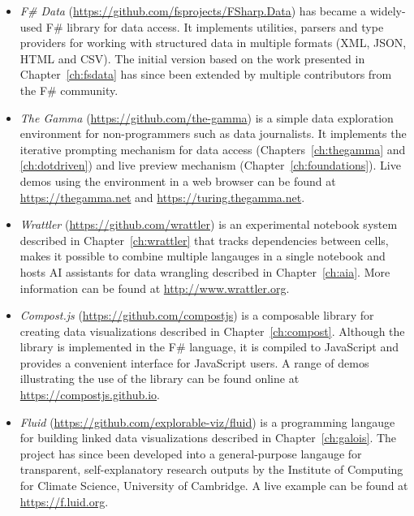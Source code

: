 \documentclass[fleqn,11pt]{report}
\theoremstyle{definition}
\newenvironment{nitemize}
{ \vspace{-0.4em}
  \begin{itemize}
    \setlength{\itemsep}{5pt}
    \setlength{\parskip}{0pt}
    \setlength{\parsep}{0pt} }
{ \end{itemize}
  \vspace{-0.4em} }
\begin{document}
\begin{nitemize}
  \item \emph{F\# Data} (\url{https://github.com/fsprojects/FSharp.Data}) has became a widely-used
    F\# library for data access. It implements utilities, parsers and type providers for working
    with structured data in multiple formats (XML, JSON, HTML and CSV). The initial version based
    on the work presented in Chapter~\ref{ch:fsdata} has since been extended by multiple
    contributors from the F\# community.

  \item \emph{The Gamma} (\url{https://github.com/the-gamma}) is a simple data exploration
    environment for non-programmers such as data journalists. It implements the iterative
    prompting mechanism for data access (Chapters~\ref{ch:thegamma} and \ref{ch:dotdriven})
    and live preview mechanism (Chapter~\ref{ch:foundations}). Live demos using the environment
    in a web browser can  be found at \url{https://thegamma.net} and \url{https://turing.thegamma.net}.

  \item \emph{Wrattler} (\url{https://github.com/wrattler}) is an experimental notebook system
    described in Chapter~\ref{ch:wrattler} that tracks dependencies between cells, makes it
    possible to combine multiple langauges in a single notebook and hosts AI assistants for
    data wrangling described in Chapter~\ref{ch:aia}. More information can be found at
    \url{http://www.wrattler.org}.

  \item \emph{Compost.js} (\url{https://github.com/compostjs}) is a composable library for creating
    data visualizations described in Chapter~\ref{ch:compost}. Although the library is implemented
    in the F\# language, it is compiled to JavaScript and provides a convenient interface for
    Java\-Script users. A range of demos illustrating the use of the library can be found online at
    \url{https://compostjs.github.io}.

  \item \emph{Fluid} (\url{https://github.com/explorable-viz/fluid}) is a programming langauge
    for building linked data visualizations described in Chapter~\ref{ch:galois}. The project has
    since been developed into a general-purpose langauge for transparent, self-explanatory research
    outputs by the Institute of Computing for Climate Science, University of Cambridge.
    A live example can be found at \url{https://f.luid.org}.
\end{nitemize}
\end{document}
